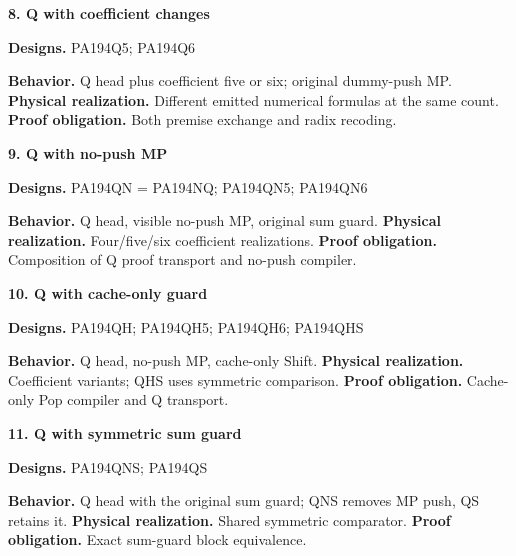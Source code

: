 \documentclass[10pt,a4paper]{article}
\begin{document}
\par\medskip\begin{samepage}\noindent\textbf{8. Q with coefficient changes}\par\nobreak
\textbf{Designs.} PA194\allowbreak{}Q5;\allowbreak{} PA194\allowbreak{}Q6

\textbf{Behavior.} Q head plus coefficient five or six; original dummy-push MP. \textbf{Physical realization.} Different emitted numerical formulas at the same count. \textbf{Proof obligation.} Both premise exchange and radix recoding.
\end{samepage}

\par\medskip\begin{samepage}\noindent\textbf{9. Q with no-push MP}\par\nobreak
\textbf{Designs.} PA194\allowbreak{}QN = PA194\allowbreak{}NQ;\allowbreak{} PA194\allowbreak{}QN5;\allowbreak{} PA194\allowbreak{}QN6

\textbf{Behavior.} Q head, visible no-push MP, original sum guard. \textbf{Physical realization.} Four/five/six coefficient realizations. \textbf{Proof obligation.} Composition of Q proof transport and no-push compiler.
\end{samepage}

\par\medskip\begin{samepage}\noindent\textbf{10. Q with cache-only guard}\par\nobreak
\textbf{Designs.} PA194\allowbreak{}QH;\allowbreak{} PA194\allowbreak{}QH5;\allowbreak{} PA194\allowbreak{}QH6;\allowbreak{} PA194\allowbreak{}QHS

\textbf{Behavior.} Q head, no-push MP, cache-only Shift. \textbf{Physical realization.} Coefficient variants; QHS uses symmetric comparison. \textbf{Proof obligation.} Cache-only Pop compiler and Q transport.
\end{samepage}

\par\medskip\begin{samepage}\noindent\textbf{11. Q with symmetric sum guard}\par\nobreak
\textbf{Designs.} PA194\allowbreak{}QNS;\allowbreak{} PA194\allowbreak{}QS

\textbf{Behavior.} Q head with the original sum guard; QNS removes MP push, QS retains it. \textbf{Physical realization.} Shared symmetric comparator. \textbf{Proof obligation.} Exact sum-guard block equivalence.
\end{samepage}
\end{document}

